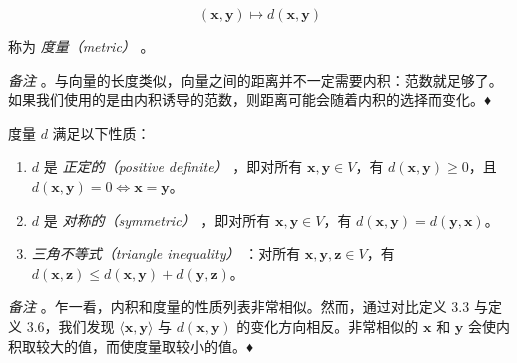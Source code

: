 \begin{equation}
(\boldsymbol{x}, \boldsymbol{y}) \mapsto d(\boldsymbol{x}, \boldsymbol{y})
\tag{3.23}\label{eq:3-23}
\end{equation}

称为 \emph{度量（metric）} 。

\emph{备注} 。与向量的长度类似，向量之间的距离并不一定需要内积：范数就足够了。如果我们使用的是由内积诱导的范数，则距离可能会随着内积的选择而变化。♦

度量 $ d $ 满足以下性质：

\begin{enumerate}
\item $ d $ 是 \emph{正定的（positive definite）} ，即对所有 $ \boldsymbol{x}, \boldsymbol{y} \in V $，有 $ d(\boldsymbol{x}, \boldsymbol{y}) \geqslant 0 $，且 $ d(\boldsymbol{x}, \boldsymbol{y}) = 0 \iff \boldsymbol{x} = \boldsymbol{y} $。
\item $ d $ 是 \emph{对称的（symmetric）} ，即对所有 $ \boldsymbol{x}, \boldsymbol{y} \in V $，有 $ d(\boldsymbol{x}, \boldsymbol{y}) = d(\boldsymbol{y}, \boldsymbol{x}) $。
\item \emph{三角不等式（triangle inequality）} ：对所有 $ \boldsymbol{x}, \boldsymbol{y}, \boldsymbol{z} \in V $，有 $ d(\boldsymbol{x}, \boldsymbol{z}) \leqslant d(\boldsymbol{x}, \boldsymbol{y}) + d(\boldsymbol{y}, \boldsymbol{z}) $。
\end{enumerate}

\emph{备注} 。乍一看，内积和度量的性质列表非常相似。然而，通过对比定义 3.3 与定义 3.6，我们发现 $ \langle \boldsymbol{x}, \boldsymbol{y} \rangle $ 与 $ d(\boldsymbol{x}, \boldsymbol{y}) $ 的变化方向相反。非常相似的 $ \boldsymbol{x} $ 和 $ \boldsymbol{y} $ 会使内积取较大的值，而使度量取较小的值。♦
